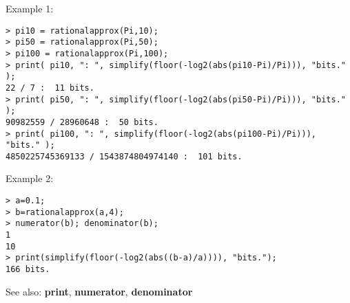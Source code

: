 \noindent Example 1: 
\begin{center}\begin{minipage}{15cm}\begin{Verbatim}[frame=single]
> pi10 = rationalapprox(Pi,10);
> pi50 = rationalapprox(Pi,50);
> pi100 = rationalapprox(Pi,100);
> print( pi10, ": ", simplify(floor(-log2(abs(pi10-Pi)/Pi))), "bits." );
22 / 7 :  11 bits.
> print( pi50, ": ", simplify(floor(-log2(abs(pi50-Pi)/Pi))), "bits." );
90982559 / 28960648 :  50 bits.
> print( pi100, ": ", simplify(floor(-log2(abs(pi100-Pi)/Pi))), "bits." );
4850225745369133 / 1543874804974140 :  101 bits.
\end{Verbatim}
\end{minipage}\end{center}
\noindent Example 2: 
\begin{center}\begin{minipage}{15cm}\begin{Verbatim}[frame=single]
> a=0.1;
> b=rationalapprox(a,4);
> numerator(b); denominator(b);
1
10
> print(simplify(floor(-log2(abs((b-a)/a)))), "bits.");
166 bits.
\end{Verbatim}
\end{minipage}\end{center}
See also: \textbf{print}, \textbf{numerator}, \textbf{denominator}
